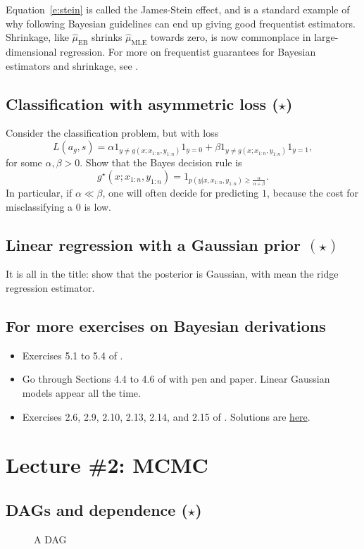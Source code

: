 \documentclass{article}
\begin{document}
\begin{enumerate}
Equation~\ref{e:stein} is called the James-Stein effect, and is a standard example of why following Bayesian guidelines can end up giving good frequentist estimators. Shrinkage, like $\hat\mu_\text{EB}$ shrinks $\hat\mu_\text{MLE}$ towards zero, is now commonplace in large-dimensional regression. For more on frequentist guarantees for Bayesian estimators and shrinkage, see \citep[Sections 7, 8, 9]{PaIn09}.
\end{enumerate}

\subsection{Classification with asymmetric loss ($\star$)}
Consider the classification problem, but with loss
$$
L(a_g,s) = \alpha 1_{y\neq g(x; x_{1:n}, y_{1:n})} 1_{y=0} + \beta 1_{y\neq g(x; x_{1:n}, y_{1:n})} 1_{y=1},
$$
for some $\alpha,\beta>0$.
Show that the Bayes decision rule is
$$ g^\star(x; x_{1:n}, y_{1:n}) = 1_{p(y\vert x, x_{1:n}, y_{1:n}) \geq \frac{\alpha}{\alpha+\beta}}.$$
In particular, if $\alpha\ll\beta$, one will often decide for predicting $1$, because the cost for misclassifying a 0 is low.
\subsection{Linear regression with a Gaussian prior $(\star)$}
It is all in the title: show that the posterior is Gaussian, with mean the ridge regression estimator.

 \subsection{For more exercises on Bayesian derivations}
 \begin{itemize}
   \item Exercises 5.1 to 5.4 of \citep{Mur12}.
   \item Go through Sections 4.4 to 4.6 of \citep{Mur12} with pen and paper. Linear Gaussian models appear all the time.
   \item Exercises 2.6, 2.9, 2.10, 2.13, 2.14, and 2.15 of \citep{MaRo07}. Solutions are \href{https://arxiv.org/abs/0910.4696}{here}.
 \end{itemize}

\section{Lecture \#2: MCMC}

\subsection{DAGs and dependence ($\star$)}
\begin{figure}
  \centering
\caption{A DAG}
\label{f:dag}
\end{figure}
\end{document}
